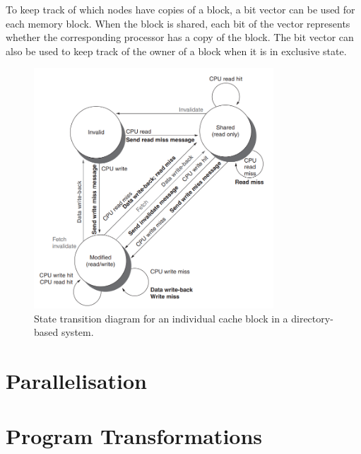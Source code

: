 \documentclass[11pt]{article}
\begin{document}
To keep track of which nodes have copies of a block, a bit vector can be used for each memory block. When the block is shared, each bit of the vector represents whether the corresponding processor has a copy of the block. The bit vector can also be used to keep track of the owner of a block when it is in exclusive state. 
\begin{figure}[H]
\centering
\includegraphics[width=0.8\textwidth, keepaspectratio]{imgs/directory-ts.png}
\caption{State transition diagram for an individual cache block in a directory-based system.}
\end{figure}
\section{Parallelisation}

\section{Program Transformations}
\end{document}
